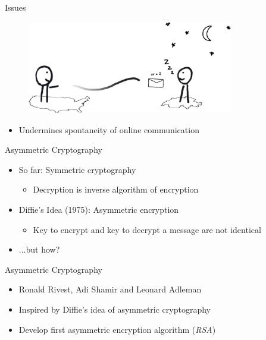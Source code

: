 \documentclass[handout]{beamer}
\begin{document}
\begin{frame}{Issues}
	\vspace{-0.3cm}
	\begin{figure}
		\centering
		\includegraphics[width = 9cm]{../assets/images/drawing_DHM_exchange.png}
	\end{figure}
	\vspace{0.5cm}
	\begin{itemize}
		\item<1-> Undermines spontaneity of online communication
	\end{itemize}
\end{frame}

\begin{frame}{Asymmetric Cryptography}
	\begin{itemize}
		\item<1-> So far: Symmetric cryptography
		\begin{itemize}
			\item<1->Decryption is inverse algorithm of encryption
		\end{itemize}
		\item<2-> Diffie's Idea (1975): Asymmetric encryption
		\begin{itemize}
			\item<2->Key to encrypt and key to decrypt a message are not identical
		\end{itemize}
		\item<3->...but how?
	\end{itemize}
\end{frame}

\begin{frame}{Asymmetric Cryptography}
	\begin{itemize}
		\item<1-> Ronald Rivest, Adi Shamir and Leonard Adleman
		\item<2-> Inspired by Diffie's idea of asymmetric cryptography
		\item<3-> Develop first asymmetric encryption algorithm (\textit{RSA}) \cite{rivest1978}
	\end{itemize}
\end{frame}
\end{document}
